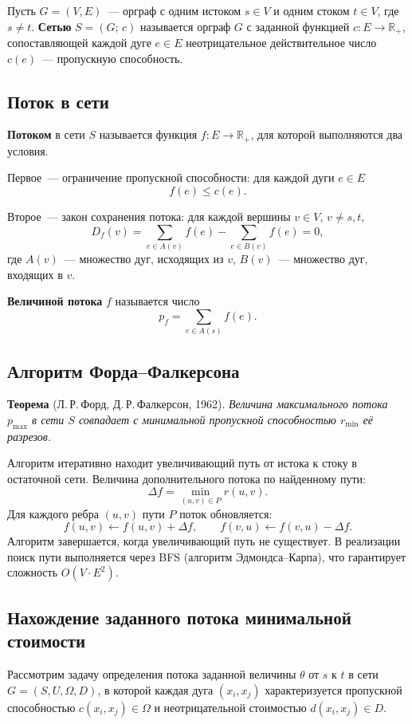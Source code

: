 Пусть $G = (V, E)$~--- орграф с одним истоком $s \in V$ и одним стоком
$t \in V$, где $s \neq t$. \textbf{Сетью} $S = (G;\, c)$ называется орграф
$G$ с заданной функцией $c : E \to \mathbb{R}_+$, сопоставляющей каждой
дуге $e \in E$ неотрицательное действительное число $c(e)$~--- пропускную
способность.

\subsection{Поток в сети}

\textbf{Потоком} в сети $S$ называется функция $f : E \to \mathbb{R}_+$,
для которой выполняются два условия.

Первое~--- ограничение пропускной способности: для каждой дуги $e \in E$
\[
    f(e) \leqslant c(e).
\]

Второе~--- закон сохранения потока: для каждой вершины $v \in V$,
$v \neq s, t$,
\[
    D_f(v) = \sum_{e \in A(v)} f(e) - \sum_{e \in B(v)} f(e) = 0,
\]
где $A(v)$~--- множество дуг, исходящих из $v$,
$B(v)$~--- множество дуг, входящих в $v$.

\textbf{Величиной потока} $f$ называется число
\[
    p_f = \sum_{e \in A(s)} f(e).
\]

\subsection{Алгоритм Форда--Фалкерсона}

\textbf{Теорема} (Л.\,Р.\,Форд, Д.\,Р.\,Фалкерсон, 1962).
\textit{Величина максимального потока $p_{\max}$ в сети $S$ совпадает
с минимальной пропускной способностью $r_{\min}$ её разрезов.}

Алгоритм итеративно находит увеличивающий путь от истока к стоку
в остаточной сети. Величина дополнительного потока по найденному пути:
\[
    \Delta f = \min_{(u,v) \in P} r(u,v).
\]
Для каждого ребра $(u,v)$ пути $P$ поток обновляется:
\[
    f(u,v) \leftarrow f(u,v) + \Delta f, \qquad
    f(v,u) \leftarrow f(v,u) - \Delta f.
\]
Алгоритм завершается, когда увеличивающий путь не существует.
В реализации поиск пути выполняется через BFS (алгоритм Эдмондса--Карпа),
что гарантирует сложность $O(V \cdot E^2)$.

\subsection{Нахождение заданного потока минимальной стоимости}

Рассмотрим задачу определения потока заданной величины $\theta$ от $s$ к
$t$ в сети $G = (S, U, \Omega, D)$, в которой каждая дуга $(x_i, x_j)$
характеризуется пропускной способностью $c(x_i, x_j) \in \Omega$ и
неотрицательной стоимостью $d(x_i, x_j) \in D$.

